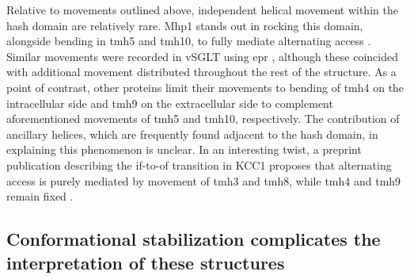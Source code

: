 Relative to movements outlined above, independent helical movement within the hash domain are relatively rare. Mhp1 stands out in rocking this domain, alongside bending in \gls{tmh}5 and \gls{tmh}10, to fully mediate alternating access \citep*{Kazmier2014a, Shimamura2010, Weyand2008}. Similar movements were recorded in vSGLT using \gls{epr} \citep*{Paz2018}, although these coincided with additional movement distributed throughout the rest of the structure. As a point of contrast, other proteins limit their movements to bending of \gls{tmh}4 on the intracellular side and \gls{tmh}9 on the extracellular side to complement aforementioned movements of \gls{tmh}5 and \gls{tmh}10, respectively. The contribution of ancillary helices, which are frequently found adjacent to the hash domain, in explaining this phenomenon is unclear. In an interesting twist, a preprint publication describing the \gls{if}-to-\gls{of} transition in KCC1 proposes that alternating access is purely mediated by movement of \gls{tmh}3 and \gls{tmh}8, while \gls{tmh}4 and \gls{tmh}9 remain fixed \citep*{Liu2019, Zhao2020}.

\subsection{Conformational stabilization complicates the interpretation of these structures}

